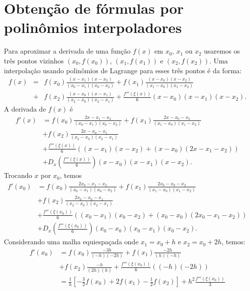 \section{Obtenção de fórmulas por polinômios interpoladores}

Para aproximar a derivada de uma função $f(x)$ em $x_0$, $x_1$ ou $x_2$ usaremos os três pontos vizinhos $(x_0,f(x_0))$, $(x_{1},f(x_{1}))$ e $(x_{2},f(x_{2}))$. Uma interpolação usando polinômios de Lagrange para esses três pontos é da forma:
\begin{eqnarray*}
f(x)&=&f(x_0)\frac{(x-x_{1})(x-x_{2})}{(x_0-x_{1})(x_0-x_{2})}
+f(x_{1})\frac{(x-x_{0})(x-x_{2})}{(x_{1}-x_{0})(x_{1}-x_{2})}\\
&+&f(x_{2})\frac{(x-x_{0})(x-x_{1})}{(x_{2}-x_{0})(x_{2}-x_{1})} 
+\frac{f'''(\xi(x))}{6}(x-x_0)(x-x_{1})(x-x_{2}).
\end{eqnarray*}
A derivada de $f(x)$ é
\begin{equation}\label{tres_pontos}
  \begin{split}
    f'(x) &= f(x_0)\frac{2x-x_{1}-x_{2}}{(x_0-x_{1})(x_0-x_{2})}
    +f(x_{1})\frac{2x-x_{0}-x_{2}}{(x_{1}-x_{0})(x_{1}-x_{2})}\\
    &+f(x_{2})\frac{2x-x_{0}-x_{1}}{(x_{2}-x_{0})(x_{2}-x_{1})}\\
    &+\frac{f'''(\xi(x))}{6} \left( (x-x_{1})(x-x_{2}) +(x-x_0)(2x-x_{1}-x_{2})\right)\\
    &+ D_x\left(\frac{f'''(\xi(x))}{6}\right)(x-x_0)(x-x_1)(x-x_2).    
  \end{split}
\end{equation}
Trocando $x$ por $x_0$, temos
\begin{equation}
  \begin{split}
    f'(x_0)&= f(x_0)\frac{2x_0-x_{1}-x_{2}}{(x_0-x_{1})(x_0-x_{2})}
    +f(x_{1})\frac{2x_0-x_{0}-x_{2}}{(x_{1}-x_{0})(x_{1}-x_{2})}\\
    &+f(x_{2})\frac{2x_0-x_{0}-x_{1}}{(x_{2}-x_{0})(x_{2}-x_{1})}\\
    &+ \frac{f'''(\xi(x_0))}{6} \left( (x_0-x_{1})(x_0-x_{2}) +(x_0-x_0)(2x_0-x_{1}-x_{2})\right)\\
    &+ D_x\left(\frac{f'''(\xi(x_0))}{6}\right)(x_0-x_0)(x_0-x_1)(x_0-x_2).
  \end{split}
\end{equation}
Considerando uma malha equiespaçada onde $x_1=x_0+h$ e $x_2=x_0+2h$, temos:
\begin{equation}
  \begin{split}
  f'(x_0)&= f(x_0)\frac{-3h}{(-h)(-2h)} + f(x_{1})\frac{-2h}{(h)(-h)} \\
  &+f(x_{2})\frac{-h}{(2h)(h)}+\frac{f'''(\xi(x_0))}{6} \left( (-h)(-2h)\right)\\
  &= \frac{1}{h}\left[-\frac{3}{2}f(x_0)+2f(x_{1})-\frac{1}{2}f(x_{2})\right]+h^2\frac{f'''(\xi(x_0))}{3}    
  \end{split}
\end{equation}
